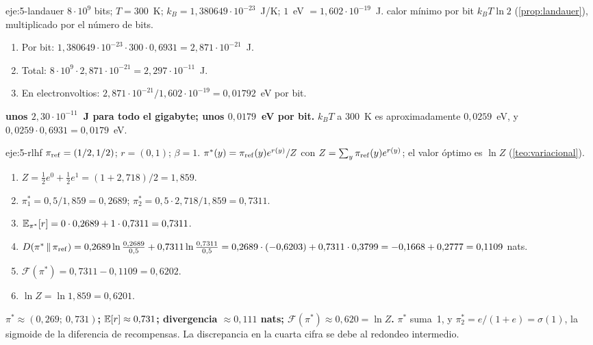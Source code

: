 \begin{solucion}{eje:5-landauer}
\datos $8\cdot 10^{9}$ bits; $T=300$~K; $k_B=1{,}380649\cdot10^{-23}$~J/K; $1$~eV $=1{,}602\cdot10^{-19}$~J.
\planteamiento calor mínimo por bit $k_BT\ln 2$ (\cref{prop:landauer}), multiplicado por el número de bits.
\pasos
\begin{enumerate}[label=\arabic*.]
  \item Por bit: $1{,}380649\cdot10^{-23}\cdot 300\cdot 0{,}6931=2{,}871\cdot10^{-21}$~J.
  \item Total: $8\cdot10^{9}\cdot 2{,}871\cdot10^{-21}=2{,}297\cdot10^{-11}$~J.
  \item En electronvoltios: $2{,}871\cdot10^{-21}/1{,}602\cdot10^{-19}=0{,}01792$~eV por bit.
\end{enumerate}
\resultado \textbf{unos $2{,}30\cdot10^{-11}$~J para todo el gigabyte; unos $0{,}0179$~eV por bit.}
\comprobacion $k_BT$ a 300~K es aproximadamente $0{,}0259$~eV, y $0{,}0259\cdot 0{,}6931=0{,}0179$~eV.
\end{solucion}

\begin{solucion}{eje:5-rlhf}
\datos $\pi_{\mathrm{ref}}=(1/2,1/2)$; $r=(0,1)$; $\beta=1$.
\planteamiento $\pi^{*}(y)=\pi_{\mathrm{ref}}(y)e^{r(y)}/Z$ con $Z=\sum_y\pi_{\mathrm{ref}}(y)e^{r(y)}$; el valor óptimo es $\ln Z$ (\cref{teo:variacional}).
\pasos
\begin{enumerate}[label=\arabic*.]
  \item $Z=\tfrac12e^{0}+\tfrac12e^{1}=(1+2{,}718)/2=1{,}859$.
  \item $\pi^{*}_1=0{,}5/1{,}859=0{,}2689$; $\pi^{*}_2=0{,}5\cdot 2{,}718/1{,}859=0{,}7311$.
  \item $\mathbb{E}_{\pi^{*}}[r]=0\cdot 0{,}2689+1\cdot 0{,}7311=0{,}7311$.
  \item $D(\pi^{*}\,\|\,\pi_{\mathrm{ref}})=0{,}2689\ln\tfrac{0{,}2689}{0{,}5}+0{,}7311\ln\tfrac{0{,}7311}{0{,}5}=0{,}2689\cdot(-0{,}6203)+0{,}7311\cdot 0{,}3799=-0{,}1668+0{,}2777=0{,}1109$ nats.
  \item $\mathcal{F}(\pi^{*})=0{,}7311-0{,}1109=0{,}6202$.
  \item $\ln Z=\ln 1{,}859=0{,}6201$.
\end{enumerate}
\resultado \textbf{$\pi^{*}\approx(0{,}269;\ 0{,}731)$; $\mathbb{E}[r]\approx 0{,}731$; divergencia $\approx 0{,}111$ nats; $\mathcal{F}(\pi^{*})\approx 0{,}620=\ln Z$.}
\comprobacion $\pi^{*}$ suma~1, y $\pi^{*}_2=e/(1+e)=\sigma(1)$, la sigmoide de la diferencia de recompensas. La discrepancia en la cuarta cifra se debe al redondeo intermedio.
\end{solucion}

